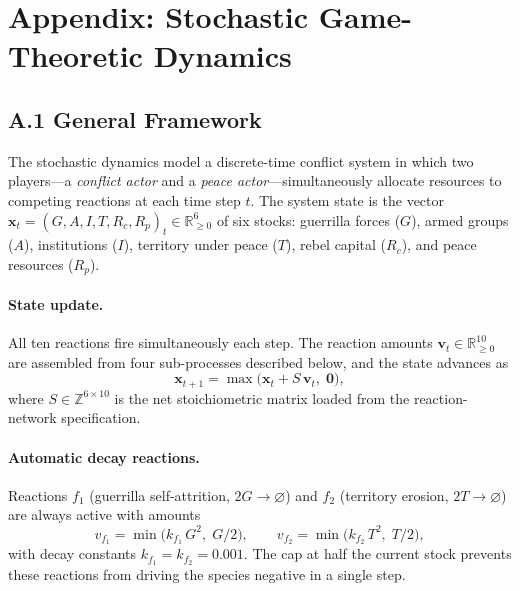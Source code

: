 
\section*{Appendix: Stochastic Game-Theoretic Dynamics}

\subsection*{A.1 General Framework}

The stochastic dynamics model a discrete-time conflict system in which two
players---a \emph{conflict actor} and a \emph{peace actor}---simultaneously
allocate resources to competing reactions at each time step $t$.  The system
state is the vector $\mathbf{x}_t = (G,A,I,T,R_c,R_p)_t \in \mathbb{R}_{\geq 0}^6$
of six stocks: guerrilla forces ($G$), armed groups ($A$), institutions ($I$),
territory under peace ($T$), rebel capital ($R_c$), and peace resources ($R_p$).

\paragraph{State update.}
All ten reactions fire simultaneously each step.  The reaction amounts
$\mathbf{v}_t \in \mathbb{R}_{\geq 0}^{10}$ are assembled from four
sub-processes described below, and the state advances as
\begin{equation}
    \mathbf{x}_{t+1} = \max\!\bigl(\mathbf{x}_t + S\,\mathbf{v}_t,\;\mathbf{0}\bigr),
    \label{eq:update}
\end{equation}
where $S \in \mathbb{Z}^{6\times 10}$ is the net stoichiometric matrix loaded
from the reaction-network specification.

\paragraph{Automatic decay reactions.}
Reactions $f_1$ (guerrilla self-attrition, $2G\!\to\!\varnothing$) and
$f_2$ (territory erosion, $2T\!\to\!\varnothing$) are always active with
amounts
\begin{equation}
    v_{f_1} = \min\!\bigl(k_{f_1}\,G^2,\;G/2\bigr),
    \qquad
    v_{f_2} = \min\!\bigl(k_{f_2}\,T^2,\;T/2\bigr),
\end{equation}
with decay constants $k_{f_1}=k_{f_2}=0.001$.  The cap at half the current
stock prevents these reactions from driving the species negative in a single step.

